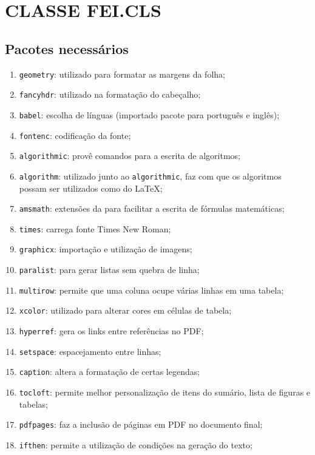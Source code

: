 \chapter{CLASSE FEI.CLS}\label{chap:classe}

\section{Pacotes necessários}\label{sec:pacotes}
    
    \begin{enumerate}
        \item\verb+geometry+: utilizado para formatar as margens da folha;
        \item\verb+fancyhdr+: utilizado na formatação do cabeçalho;
        \item\verb+babel+: escolha de línguas (importado pacote para português e inglês);
        \item\verb+fontenc+: codificação da fonte;
        \item\verb+algorithmic+: provê comandos para a escrita de algoritmos;
        \item\verb+algorithm+: utilizado junto ao \texttt{algorithmic}, faz com que os algoritmos possam ser utilizados como  do \LaTeX;
        \item\verb+amsmath+: extensões da  para facilitar a escrita de fórmulas matemáticas;
        \item\verb+times+: carrega fonte Times New Roman;
        \item\verb+graphicx+: importação e utilização de imagens;
        \item\verb+paralist+: para gerar listas sem quebra de linha;
        \item\verb+multirow+: permite que uma coluna ocupe várias linhas em uma tabela;
        \item\verb+xcolor+: utilizado para alterar cores em células de tabela;
        \item\verb+hyperref+: gera os links entre referências no PDF;
        \item\verb+setspace+: espacejamento entre linhas;
        \item\verb+caption+: altera a formatação de certas legendas;
        \item\verb+tocloft+: permite melhor personalização de itens do sumário, lista de figuras e tabelas;
        \item\verb+pdfpages+: faz a inclusão de páginas em PDF no documento final;
        \item\verb+ifthen+: permite a utilização de condições na geração do texto;
    \end{enumerate}

